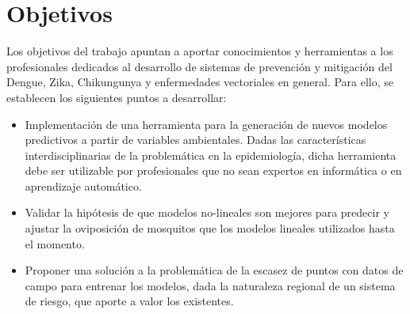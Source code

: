 \section{Objetivos}

  \par Los objetivos del trabajo apuntan a aportar conocimientos y
    herramientas a los profesionales dedicados al desarrollo de sistemas de
    prevención y mitigación del Dengue, Zika, Chikungunya y enfermedades
    vectoriales en general. Para ello, se establecen los siguientes puntos
    a desarrollar:
    \begin{itemize}
      \item Implementación de una herramienta para la generación de nuevos modelos
        predictivos a partir de variables ambientales. Dadas las
        características interdisciplinarias de la
        problemática en la epidemiología, dicha herramienta
        debe ser utilizable por profesionales que no sean expertos en
        informática o en aprendizaje automático.
      \item Validar la hipótesis de que modelos no-lineales son mejores
        para predecir y ajustar la oviposición de mosquitos que los modelos
        lineales utilizados hasta el momento.
      \item Proponer una solución a la problemática de la
        escasez de puntos con datos de campo para entrenar los modelos,
        dada la naturaleza regional de un sistema de riesgo, que aporte a
        valor los existentes.
    \end{itemize}

%
